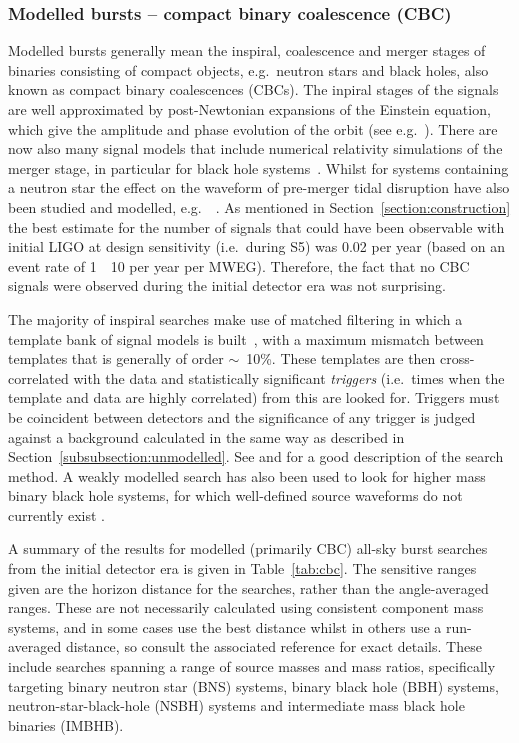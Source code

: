 \subsubsection{Modelled bursts -- compact binary coalescence (CBC)}
\label{sec:cbc} 

Modelled bursts generally mean the inspiral, coalescence and merger stages of binaries consisting of compact objects, 
e.g.\ neutron stars and black holes, also known as compact binary coalescences (CBCs). The inpiral stages of 
the signals are well approximated by post-Newtonian expansions of the Einstein equation, which give the 
amplitude and phase evolution of the orbit (see e.g.\ \cite{lrr-2007-2, lrr-2014-2}). There are now also many 
signal models that include numerical relativity simulations \cite{lrr-2015-1} of the merger stage, in 
particular for black hole systems~\cite{Aylott:2009, 2014CQGra..31k5004A}. Whilst for systems containing a 
neutron star the effect on the waveform of pre-merger tidal disruption have also been studied and modelled, 
e.g.\ ~\cite{2009PhRvD..79l4033R, 2010PhRvD..81f4026F}. As mentioned in Section~\ref{section:construction} 
the best estimate for the number of signals that could have been observable with initial LIGO at design 
sensitivity (i.e.\ during S5) was 0.02 per year (based on an event rate of 1~\texttimes~10 per year 
per MWEG). Therefore, the fact that no CBC signals were observed during the initial detector era was not 
surprising.

The majority of inspiral searches make use of matched filtering in which a template bank of signal models is 
built~\cite{Owen:1996, Owen:1999}, with a maximum mismatch between templates that is generally of order 
$\sim$~10\%. These templates are then cross-correlated with the data and statistically significant
\textit{triggers} (i.e.\ times when the template and data are highly correlated) from this are looked for. 
Triggers must be coincident between detectors and the significance of any trigger is judged against a 
background calculated in the same way as described in Section~\ref{subsubsection:unmodelled}. See
\cite{Abbott:2005b} and \cite{2012PhRvD..85l2006A} for a good description of the search method. A weakly 
modelled search has also been used to look for higher mass binary black hole systems, for which well-defined 
source waveforms do not currently exist \cite{2008CQGra..25k4029K, 2012PhRvD..85j2004A}.

A summary of the results for modelled (primarily CBC) all-sky burst searches from the initial detector era is 
given in Table~\ref{tab:cbc}. The sensitive ranges given are the horizon distance for the searches, rather than
the angle-averaged ranges. These are 
not necessarily calculated using consistent component mass systems, and in some cases use the best distance 
whilst in others use a run-averaged distance, so consult the associated reference for exact details. 
These include searches spanning a range of source masses and mass ratios, specifically targeting binary 
neutron star (BNS) systems, binary black hole (BBH) systems, neutron-star-black-hole (NSBH) systems and 
intermediate mass black hole binaries (IMBHB).

